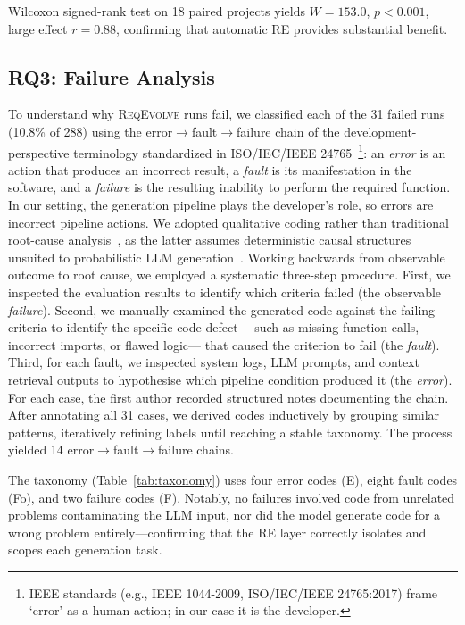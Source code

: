 \documentclass[sigconf,screen]{acmart}
\begin{document}
Wilcoxon signed-rank test on 18 paired projects yields $W = 153.0$, $p < 0.001$, large effect $r = 0.88$, confirming that automatic RE provides substantial benefit.

\subsection{RQ3: Failure Analysis}

To understand why \textsc{ReqEvolve} runs fail, we classified each of the 31 failed runs (10.8\% of 288) using the error$\to$fault$\to$failure chain of the development-perspective terminology standardized in ISO/IEC/IEEE 24765~\cite{iso24765}\footnote{IEEE standards (e.g., IEEE 1044-2009, ISO/IEC/IEEE 24765:2017) frame `error' as a human action; in our case it is the developer.}: an \textit{error} is an action that produces an incorrect result, a \textit{fault} is its manifestation in the software, and a \textit{failure} is the resulting inability to perform the required function. In our setting, the generation pipeline plays the developer's role, so errors are incorrect pipeline actions. We adopted qualitative coding rather than traditional root-cause analysis~\cite{ikram2022root,budhathoki2022causal}, as the latter assumes deterministic causal structures unsuited to probabilistic LLM generation~\cite{zhang2025failure}. Working backwards from observable outcome to root cause, we employed a systematic three-step procedure. First, we inspected the evaluation results to identify which criteria failed (the observable \textit{failure}). Second, we manually examined the generated code against the failing criteria to identify the specific code defect--- such as missing function calls, incorrect imports, or  flawed logic--- that caused the criterion to fail (the \textit{fault}). Third, for each fault, we inspected system logs, LLM prompts, and context retrieval outputs to hypothesise which pipeline condition produced it (the \textit{error}). For each case, the first author recorded structured notes documenting the chain. After annotating all 31 cases, we derived codes inductively by grouping similar patterns, iteratively refining labels until reaching a stable taxonomy. The process yielded 14  error$\to$fault$\to$failure chains.

The taxonomy (Table~\ref{tab:taxonomy}) uses four error codes (E), eight
fault codes (Fo), and two failure codes (F). Notably, no failures involved
code from unrelated problems contaminating the LLM input, nor did the model
generate code for a wrong problem entirely---confirming that the RE layer
correctly isolates and scopes each generation task.
\end{document}
